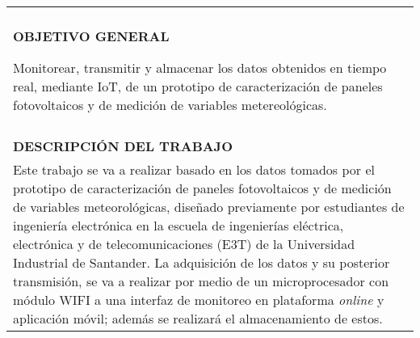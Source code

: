 \begin{tabular}{| p{15.5cm} |}
\hline
\\
\textbf{OBJETIVO GENERAL}

Monitorear, transmitir y almacenar los datos obtenidos en tiempo real, mediante IoT, de un prototipo de caracterización de paneles fotovoltaicos y de medición de variables metereológicas.\\

\\
\textbf{DESCRIPCIÓN DEL TRABAJO}  
\\
Este trabajo se va a realizar basado en los datos tomados por el prototipo de caracterización de paneles fotovoltaicos y de medición de variables meteorológicas\cite{Paneles}\cite{Proto}, diseñado previamente por estudiantes de ingeniería electrónica en la escuela de ingenierías eléctrica, electrónica y de telecomunicaciones (E3T) de la Universidad Industrial de Santander. La adquisición de los datos y su posterior transmisión, se va a realizar por medio de un microprocesador con módulo WIFI a una interfaz de monitoreo en plataforma  \textit{online} y aplicación móvil; además se realizará el almacenamiento de estos.


\\[0.1cm] \hline
\end{tabular}
			



